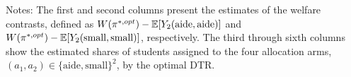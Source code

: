 \begin{table}[h!]
\begin{centering}
\caption{Empirical results for optimal class-type allocation}
\medskip
\label{table:empirical_results}
\par\end{centering}
\centering{}
\begin{tablenotes} 
\footnotesize 
\item Notes: The first and second columns present the estimates of the welfare contrasts, defined as $W(\pi^{\ast,opt}) - \mathbb{E}[Y_2(\text{aide},\text{aide})]$ and $W(\pi^{\ast,opt}) - \mathbb{E}[Y_2(\text{small},\text{small})]$, respectively. The third through sixth columns show the estimated shares of students assigned to the four allocation arms, $(a_1, a_2) \in \{\text{aide}, \text{small}\}^2$, by the optimal DTR.
\end{tablenotes} 
\end{table}


